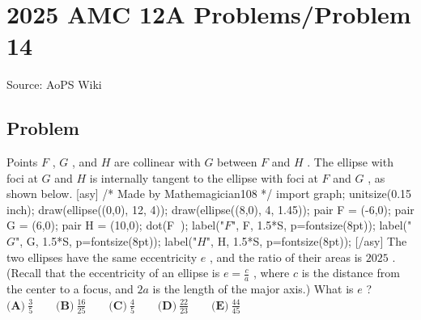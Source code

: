 \documentclass[12pt]{article}
\begin{document}
\section*{{2025 AMC 12A Problems/Problem 14}}
Source: AoPS Wiki

\subsection*{Problem}
Points $F$ , $G$ , and $H$ are collinear with $G$ between $F$ and $H$ . The ellipse with foci at $G$ and $H$ is internally tangent to the ellipse with foci at $F$ and $G$ , as shown below. [asy] /* Made by Mathemagician108 */ import graph; unitsize(0.15 inch); draw(ellipse((0,0), 12, 4)); draw(ellipse((8,0), 4, 1.45)); pair F = (-6,0); pair G = (6,0); pair H = (10,0); dot(F^^G^^H); label("$F$", F, 1.5*S, p=fontsize(8pt)); label("$G$", G, 1.5*S, p=fontsize(8pt)); label("$H$", H, 1.5*S, p=fontsize(8pt)); [/asy] The two ellipses have the same eccentricity $e$ , and the ratio of their areas is $2025$ . (Recall that the eccentricity of an ellipse is $e = \tfrac{c}{a}$ , where $c$ is the distance from the center to a focus, and $2a$ is the length of the major axis.) What is $e$ ? $\textbf{(A)}~\frac35\qquad\textbf{(B)}~\frac{16}{25}\qquad\textbf{(C)}~\frac45\qquad\textbf{(D)}~\frac{22}{23}\qquad\textbf{(E)}~\frac{44}{45}$
\end{document}
